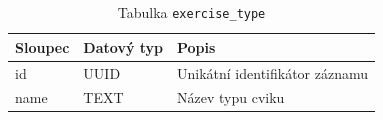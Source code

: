 \begin{table}[ht!]
    \centering
    \begin{tabularx}{\textwidth}{|l|l|L|}
        \hline
        \textbf{Sloupec} & \textbf{Datový typ} & \textbf{Popis}                 \\ \hline
        id               & UUID                & Unikátní identifikátor záznamu \\ \hline
        name             & TEXT                & Název typu cviku               \\ \hline
    \end{tabularx}
    \caption{Tabulka \texttt{exercise\_type}}
    \label{tab:exercise_type}
\end{table}
